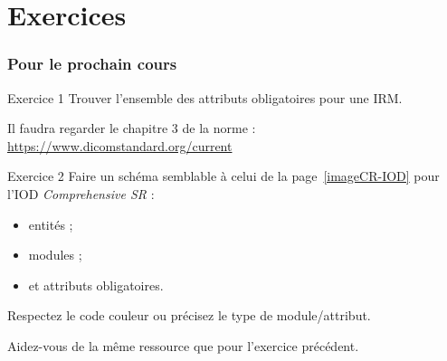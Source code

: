 \section{Exercices}

	\frame
	{
		\frametitle{Pour le prochain cours}
		
			\begin{block}{Exercice 1}
				Trouver l'ensemble des attributs obligatoires pour une IRM.

				Il faudra regarder le chapitre 3 de la norme : \url{https://www.dicomstandard.org/current}
			\end{block}

			\begin{block}{Exercice 2}
				Faire un sch\'ema semblable \`a celui de la page~\ref{imageCR-IOD} pour l'IOD \emph{Comprehensive SR} :
				\begin{itemize}
					\item entit\'es ;
					\item modules ;
					\item et attributs obligatoires.
				\end{itemize}
				Respectez le code couleur ou pr\'ecisez le type de module/attribut.

				Aidez-vous de la m\^eme ressource que pour l'exercice pr\'ec\'edent.
			\end{block}
	}
